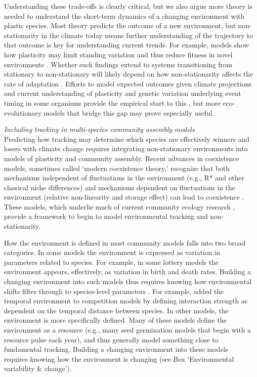 \documentclass[11pt,letterpaper]{article}
\begin{document}
Understanding these trade-offs is clearly critical, but we also argue more theory is needed to understand the short-term dynamics of a changing environment with plastic species. Most theory predicts the outcome of a new environment, but non-stationarity in the climate today means further understanding of the trajectory to that outcome is key for understanding current trends. For example, models show how plasticity may limit standing variation and thus reduce fitness in novel environments \citep{Ghalambor2007,fox2019}. Whether such findings extend to systems transitioning from stationary to non-stationary will likely depend on how non-stationarity affects the rate of adaptation \citep{chevin2010}. Efforts to model expected outcomes given climate projections and current understanding of plasticity and genetic variation underlying event timing in some organisms provide the empirical start to this \citep[e.g.,][]{fournier2016}, but more eco-evolutionary models that bridge this gap may prove especially useful. 

\emph{Including tracking in multi-species community assembly models} \\
Predicting how tracking may determine which species are effectively winners and losers with climate change requires integrating non-stationary environments into models of plasticity and community assembly. Recent advances in coexistence models, sometimes called `modern coexistence theory,' recognize that both mechanisms independent of fluctuations in the environment (e.g., R* and other classical niche differences) and mechanisms dependent on fluctuations in the environment (relative non-linearity and storage effect) can lead to coexistence \citep{Chesson:1997dz,Chesson:2000vd}. These models, which underlie much of current community ecology research \citep{Mayfield:2010fe,barabas2018,ellner2019}, provide a framework to begin to model environmental tracking and non-stationarity. 

How the environment is defined in most community models falls into two broad categories. In some models the environment is expressed as variation in parameters related to species. For example, in some lottery models the environment appears, effectively, as variation in birth and death rates. Building a changing environment into such models thus requires knowing how environmental shifts filter through to species-level parameters \citep{Tuljapurkar2009}. For example, \citet{volkerass} added the temporal environment to competition models by defining interaction strength as dependent on the temporal distance between species. In other models, the environment is more specifically defined. Many of these models define the environment as a resource (e.g., many seed germination models that begin with a resource pulse each year), and thus generally model something close to fundamental tracking. Building a changing environment into these models requires knowing how the environment is changing (see Box `Environmental variability \& change').
\end{document}
